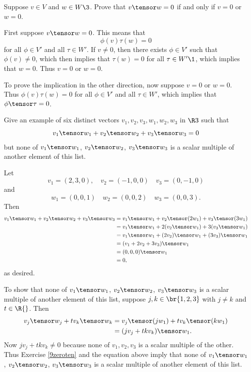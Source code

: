 
\exercise
Suppose $v \in V$ and $w \in W\3$. Prove that $v \tensor w = 0$ if and only if $v = 0$ or $w = 0$.\label{9zeroten}

\begin{Solution}
First suppose $v \tensor w = 0$. This means that
\[
\phi(v) \tau(w) = 0
\]
for all $\phi \in V'$ and all $\tau \in W'\!$. If $v \ne 0$, then there exists $\phi \in V'$ such that $\phi(v) \ne 0$, which then implies that
$\tau(w) = 0$ for all $\tau \in W'\1$, which implies that $w = 0$. Thus $v = 0$ or $w = 0$.

To prove the implication in the other direction, now suppose $v = 0$ or $w = 0$. Thus $\phi(v) \tau(w) = 0$
for all $\phi \in V'$ and all $\tau \in W'\!$, which implies that $\phi \tensor \tau = 0$.
\end{Solution}

\exercise
Give an example of six distinct vectors $v_1, v_2, v_3, w_1, w_2, w_3$ in $\R3$ such that
\[
v_1 \tensor w_1 + v_2 \tensor w_2 + v_3 \tensor w_3 = 0
\]
but none of $v_1 \tensor w_1$, $v_2 \tensor w_2$, $v_3 \tensor w_3$ is a scalar multiple of another element of this list.

\begin{Solution}
Let
\[
v_1 = (2,3, 0), \quad v_2 = (-1,0, 0) \quad v_3 = (0,-1, 0)
\]
and
\[
w_1 = (0, 0, 1) \quad w_2 = (0, 0, 2) \quad w_3 = (0, 0, 3).
\]
 Then
\begin{align*}
v_1 \tensor w_1 + v_2 \tensor w_2 + v_3 \tensor w_3 &= v_1 \tensor w_1 + v_2 \tensor (2w_1) + v_3 \tensor (3 w_1)\\
&= v_1 \tensor w_1 + 2 (v_2 \tensor w_1) + 3( v_3 \tensor w_1)\\
&= v_1 \tensor w_1 + (2 v_2) \tensor w_1 + (3 v_3) \tensor w_1\\
&= (v_1 + 2v_2 + 3v_3) \tensor w_1 \\
&= (0, 0, 0) \tensor w_1 \\
&= 0,
\end{align*}
as desired.

To show that none of $v_1 \tensor w_1$, $v_2 \tensor w_2$, $v_3 \tensor w_3$ is a scalar multiple of another element of this list, suppose $j, k \in \br{1,2,3}$ with $j \ne k$ and $t \in \R{}$. Then
\begin{align*}
v_j \tensor w_j + t v_k \tensor w_k &= v_j \tensor (jw_1) + t v_k \tensor (kw_1) \\
&= (j v_j + tkv_k) \tensor w_1.
\end{align*}
Now $j v_j + tk v_k \ne 0$ because none of $v_1, v_2, v_3$ is a scalar multiple of the other. Thus Exercise \ref{9zeroten} and the equation above imply that none of $v_1 \tensor w_1$, $v_2 \tensor w_2$, $v_3 \tensor w_3$ is a scalar multiple of another element of this list.
\end{Solution}

